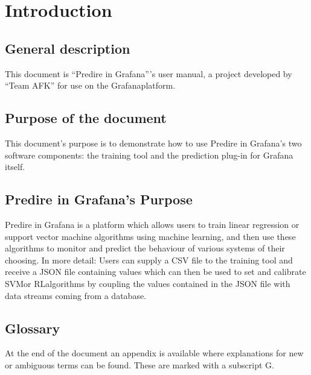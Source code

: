 \section{Introduction}

\subsection{General description}
This document is “Predire in Grafana”’s user manual, a project developed by “Team AFK” for use on the Grafana\glo platform.

\subsection{Purpose of the document}
This document’s purpose is to demonstrate how to use Predire in Grafana’s two software components: the training tool and the prediction plug-in for Grafana itself.

\subsection{Predire in Grafana’s Purpose}
Predire in Grafana is a platform which allows users to train linear regression or support vector machine algorithms using machine learning\glo, and then use these algorithms to monitor and predict the behaviour of various systems of their choosing.
In more detail:	
Users can supply a CSV file to the training tool and receive a JSON file containing values which can then be used to set and calibrate SVM\glo or RL\glo algorithms by coupling the values contained in the JSON file with data streams coming from a database.

\subsection{Glossary}
At the end of the document an appendix is available where explanations for new or ambiguous terms can be found. These are marked with a subscript G.


